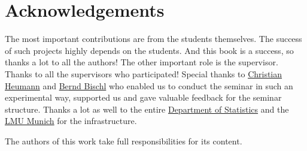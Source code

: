 \documentclass[
]{krantz}
\begin{document}
\hypertarget{acknowledgements}{%
\chapter{Acknowledgements}\label{acknowledgements}}

The most important contributions are from the students themselves.
The success of such projects highly depends on the students.
And this book is a success, so thanks a lot to all the authors!
The other important role is the supervisor.
Thanks to all the supervisors who participated!
Special thanks to \href{https://www.misoda.statistik.uni-muenchen.de/personen/professoren/heumann/index.html}{Christian Heumann} and \href{https://www.statistik.uni-muenchen.de/personen/professoren/bischl/index.html}{Bernd Bischl} who enabled us to conduct the seminar in such an experimental way, supported us and gave valuable feedback for the seminar structure.
Thanks a lot as well to the entire \href{https://www.statistik.uni-muenchen.de/}{Department of Statistics} and the \href{http://www.en.uni-muenchen.de/index.html}{LMU Munich} for the infrastructure.

The authors of this work take full responsibilities for its content.

  

\backmatter
\printindex
\end{document}

